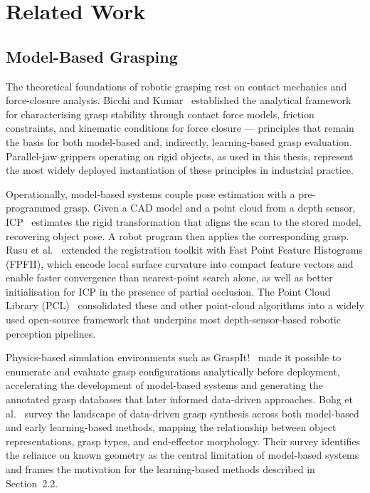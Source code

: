 \documentclass[12pt, a4paper]{report}
\begin{document}
\chapter{Related Work}
\label{chap:related-work}

\section{Model-Based Grasping}
\label{sec:model-based-grasping}

The theoretical foundations of robotic grasping rest on contact mechanics and force-closure analysis. Bicchi and Kumar~\cite{bicchi2000robotic} established the analytical framework for characterising grasp stability through contact force models, friction constraints, and kinematic conditions for force closure --- principles that remain the basis for both model-based and, indirectly, learning-based grasp evaluation. Parallel-jaw grippers operating on rigid objects, as used in this thesis, represent the most widely deployed instantiation of these principles in industrial practice.

Operationally, model-based systems couple pose estimation with a pre-programmed grasp. Given a CAD model and a point cloud from a depth sensor, ICP~\cite{besl1992} estimates the rigid transformation that aligns the scan to the stored model, recovering object pose. A robot program then applies the corresponding grasp. Rusu et al.~\cite{rusu2009fast} extended the registration toolkit with Fast Point Feature Histograms (FPFH), which encode local surface curvature into compact feature vectors and enable faster convergence than nearest-point search alone, as well as better initialisation for ICP in the presence of partial occlusion. The Point Cloud Library (PCL)~\cite{rusu2011pcl} consolidated these and other point-cloud algorithms into a widely used open-source framework that underpins most depth-sensor-based robotic perception pipelines.

Physics-based simulation environments such as GraspIt!~\cite{miller2004graspit} made it possible to enumerate and evaluate grasp configurations analytically before deployment, accelerating the development of model-based systems and generating the annotated grasp databases that later informed data-driven approaches. Bohg et al.~\cite{bohg2014data} survey the landscape of data-driven grasp synthesis across both model-based and early learning-based methods, mapping the relationship between object representations, grasp types, and end-effector morphology. Their survey identifies the reliance on known geometry as the central limitation of model-based systems and frames the motivation for the learning-based methods described in Section~2.2.
\end{document}
